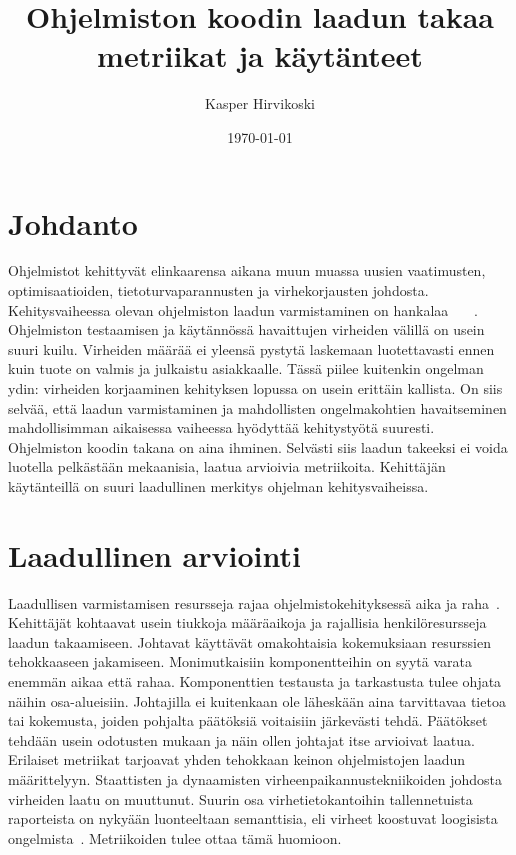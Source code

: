 \documentclass[finnish]{../tktltiki2}
\title{Ohjelmiston koodin laadun takaa metriikat ja käytänteet}
\author{Kasper Hirvikoski}
\date{\today}
\theoremstyle{definition}
\theoremstyle{remark}
\begin{document}

\maketitle

\tableofcontents
\newpage


\section{Johdanto}

Ohjelmistot kehittyvät elinkaarensa aikana muun muassa uusien vaatimusten, optimisaatioiden, tietoturvaparannusten ja 
virhekorjausten johdosta. Kehitysvaiheessa olevan ohjelmiston laadun varmistaminen on hankalaa
~\cite{NB05}~\cite{ZN08}~\cite{MND09}. Ohjelmiston testaamisen ja käytännössä havaittujen virheiden välillä on usein 
suuri kuilu. Virheiden määrää ei yleensä pystytä laskemaan luotettavasti ennen kuin tuote on valmis ja julkaistu 
asiakkaalle. Tässä piilee kuitenkin ongelman ydin: virheiden korjaaminen kehityksen lopussa on usein erittäin kallista. 
On siis selvää, että laadun varmistaminen ja mahdollisten ongelmakohtien havaitseminen mahdollisimman aikaisessa 
vaiheessa hyödyttää kehitystyötä suuresti. Ohjelmiston koodin takana on aina ihminen. Selvästi siis laadun takeeksi ei 
voida luotella pelkästään mekaanisia, laatua arvioivia metriikoita. Kehittäjän käytänteillä on suuri laadullinen 
merkitys ohjelman kehitysvaiheissa.

\section{Laadullinen arviointi}

Laadullisen varmistamisen resursseja rajaa ohjelmistokehityksessä aika ja raha~\cite{ZN08}. Kehittäjät kohtaavat usein 
tiukkoja määräaikoja ja rajallisia henkilöresursseja laadun takaamiseen. Johtavat käyttävät omakohtaisia kokemuksiaan 
resurssien tehokkaaseen jakamiseen. Monimutkaisiin komponentteihin on syytä varata enemmän aikaa että rahaa. 
Komponenttien testausta ja tarkastusta tulee ohjata näihin osa-alueisiin. Johtajilla ei kuitenkaan ole läheskään aina 
tarvittavaa tietoa tai kokemusta, joiden pohjalta päätöksiä voitaisiin järkevästi tehdä. Päätökset tehdään usein 
odotusten mukaan ja näin ollen johtajat itse arvioivat laatua. Erilaiset metriikat tarjoavat yhden tehokkaan keinon 
ohjelmistojen laadun määrittelyyn. Staattisten ja dynaamisten virheenpaikannustekniikoiden johdosta virheiden laatu 
on muuttunut. Suurin osa virhetietokantoihin tallennetuista raporteista on nykyään luonteeltaan semanttisia, eli virheet 
koostuvat loogisista ongelmista~\cite{ZN08}. Metriikoiden tulee ottaa tämä huomioon.
\end{document}
